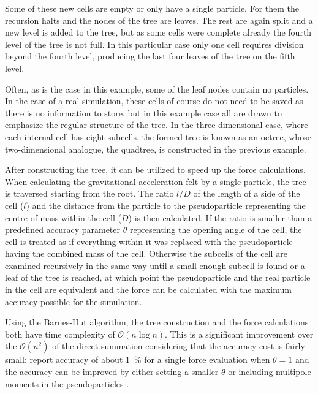 \documentclass[english, oneside]{HYgradu}
\begin{document}
Some of these new cells are empty or only have a single particle. For them the recursion halts and the nodes of the tree are leaves. The rest are again split and a new level is added to the tree, but as some cells were complete already the fourth level of the tree is not full. In this particular case only one cell requires division beyond the fourth level, producing the last four leaves of the tree on the fifth level.

Often, as is the case in this example, some of the leaf nodes contain no particles. In the case of a real simulation, these cells of course do not need to be saved as there is no information to store, but in this example case all are drawn to emphasize the regular structure of the tree. In the three-dimensional case, where each internal cell has eight subcells, the formed tree is known as an octree, whose two-dimensional analogue, the quadtree, is constructed in the previous example.

After constructing the tree, it can be utilized to speed up the force calculations. When calculating the gravitational acceleration felt by a single particle, the tree is traversed starting from the root. The ratio $l/D$ of the length of a side of the cell ($l$) and the distance from the particle to the pseudoparticle representing the centre of mass within the cell ($D$) is then calculated. If the ratio is smaller than a predefined accuracy parameter $\theta$ representing the opening angle of the cell, the cell is treated as if everything within it was replaced with the pseudoparticle having the combined mass of the cell. Otherwise the subcells of the cell are examined recursively in the same way until a small enough subcell is found or a leaf of the tree is reached, at which point the pseudoparticle and the real particle in the cell are equivalent and the force can be calculated with the maximum accuracy possible for the simulation.

Using the Barnes-Hut algorithm, the tree construction and the force calculations both have time complexity of $\mathcal{O}(n \log n)$. This is a significant improvement over the $\mathcal{O}(n^2)$ of the direct summation considering that the accuracy cost is fairly small: \citet{barnes1986hierarchical} report accuracy of about 1~\% for a single force evaluation when $\theta=1$ and the accuracy can be improved by either setting a smaller $\theta$ or including multipole moments in the pseudoparticles \citep{barnes1989error}. %
\end{document}
